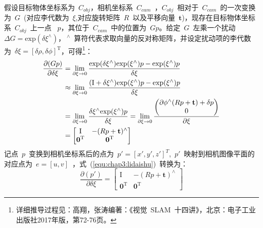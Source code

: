 假设目标物体坐标系为~$C_{obj}$，相机坐标系~$C_{cam}$~，$C_{obj}$~相对于~$C_{cam}$~的一次变换为~$G$~(对应李代数为~$\xi$,对应旋转矩阵~$R$~以及平移向量~$\mathbf{t}$)，现存在目标物体坐标系~$C_{obj}$~上一点
~$p$，其位于~$C_{cam}$~中的位置为~$Gp$。给定~$G$~左乘一个扰动~$\Delta G=\textrm{exp}(\delta \xi^\wedge)$，$~^\wedge$~算符代表求取向量的反对称矩阵，并设定扰动项的李代数为~$\delta \xi =[\delta \rho , \delta \phi]^{\textrm{T}}$，可得\footnote{详细推导过程见：高翔，张涛编著：《视觉~SLAM~十四讲》，北京：电子工业出版社2017年版，第72-76页。}：
\begin{align}
    \label{equ:chap3:lidaishu}
    \begin{split}
  \frac{\partial (Gp)}{\partial \delta \xi}&=\lim_{\partial \xi \to 0}\frac{\textrm{exp}(\delta \xi ^\wedge)\textrm{exp}(\xi^\wedge)p-\textrm{exp}(\xi^\wedge)p}{\delta \xi} \\
                                          &\approx \lim_{\partial \xi \to 0}\frac{(\textrm I+\delta \xi ^\wedge)\textrm{exp}(\xi^\wedge)p-\textrm{exp}(\xi^\wedge)p}{\delta \xi} \\
                                          &=\lim_{\partial \xi \to 0}\frac{\delta \xi^\wedge\textrm{exp}(\xi ^\wedge)p}{\delta \xi}=\lim_{\partial \xi \to 0}\frac{\left( \begin{matrix}\partial\phi^\wedge (Rp+\mathbf{t})+\delta p\\
                                                                                                                                                                            0 \end{matrix}\right)}{\partial \xi} \\
                                          &=\left[ \begin{matrix}  
                                          \textrm{I} & -(Rp+\mathbf{t})^\wedge\\
                                          \mathbf{0}^{\textrm{T}} & \mathbf{0}^{\textrm{T}}
                                          \end{matrix}\right]
    \end{split}
\end{align}
记点~$p$~变换到相机坐标系后的点为~$p'=[x',y',z']^T$,~$p'$~映射到相机图像平面的对应点为~$e=[u,v]$~，式~(\ref{equ:chap3:lidaishu})~转换为：
\begin{equation}
  \label{equ:chap3:lidaishu_deri}
\frac{\partial (p')}{\partial \delta \xi}=\left[ \begin{matrix} \textrm{I} & -(Rp+\mathbf{t})^\wedge \\ \mathbf{0}^{\textrm{T}} & \mathbf{0}^{\textrm{T}}  \end{matrix}\right]
\end{equation}
